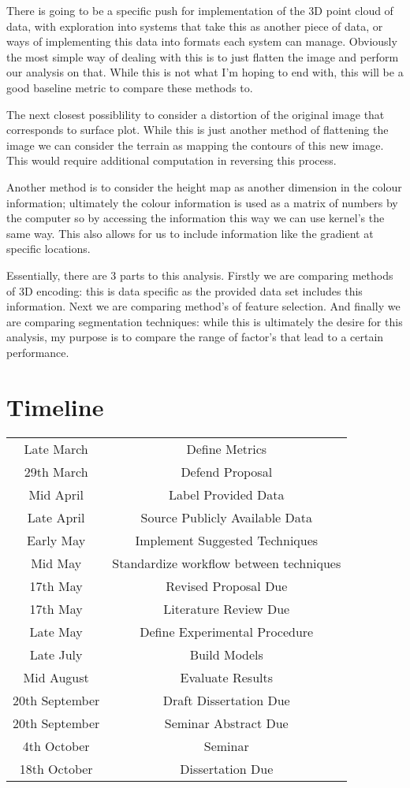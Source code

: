 \documentclass[12pt, a4paper]{article}
\begin{document}
There is going to be a specific push for implementation of the 3D point cloud of data, with exploration into systems that take this as another piece of data, or ways of implementing this data into formats each system can manage. Obviously the most simple way of dealing with this is to just flatten the image and perform our analysis on that. While this is not what I'm hoping to end with, this will be a good baseline metric to compare these methods to. 

The next closest possiblility to consider a distortion of the original image that corresponds to surface plot. While this is just another method of flattening the image we can consider the terrain as mapping the contours of this new image. This would require additional computation in reversing this process. 

Another method is to consider the height map as another dimension in the colour information; ultimately the colour information is used as a matrix of numbers by the computer so by accessing the information this way we can use kernel's the same way. This also allows for us to include information like the gradient at specific locations.

Essentially, there are 3 parts to this analysis. Firstly we are comparing methods of 3D encoding: this is data specific as the provided data set includes this information. Next we are comparing method's of feature selection. And finally we are comparing segmentation techniques: while this is ultimately the desire for this analysis, my purpose is to compare the range of factor's that lead to a certain performance.
\pagebreak

\section*{Timeline}

\begin{table}[h!]
\begin{tabular}{||c|c||}
\hline
Late March & Define Metrics \\
29th March & Defend Proposal \\
Mid April & Label Provided Data \\
Late April & Source Publicly Available Data \\
Early May & Implement Suggested Techniques \\
Mid May & Standardize workflow between techniques \\
17th May & Revised Proposal Due \\
17th May & Literature Review Due \\
Late May & Define Experimental Procedure \\
Late July & Build Models \\
Mid August & Evaluate Results \\
20th September & Draft Dissertation Due \\
20th September & Seminar Abstract Due \\
4th October & Seminar \\
18th October & Dissertation Due \\
\hline
\end{tabular}
\end{table}
\end{document}
